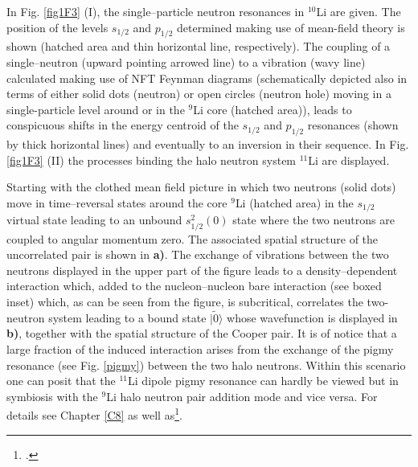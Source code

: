  
 
 
 In Fig. \ref{fig1F3} (I), the single--particle neutron resonances in $^{10}$Li are given. The 
  position of the levels $s_{1/2}$ and $p_{1/2}$ determined making use
 of mean-field theory is shown (hatched area and thin horizontal
 line, respectively). The coupling of a single--neutron (upward
 pointing arrowed line) to a vibration (wavy line) calculated
 making use of NFT Feynman diagrams 
 (schematically depicted also in terms of either solid dots (neutron)
 or open circles (neutron hole) moving in a single-particle
 level around or in the $^9$Li core (hatched area)), leads to conspicuous
 shifts in the energy centroid of the $s_{1/2}$ and $p_{1/2}$ resonances
 (shown by thick horizontal lines) and eventually to
 an inversion in their sequence. In Fig. \ref{fig1F3} (II) the  processes binding the  halo neutron system $^{11}$Li are displayed. 
 
 
 
 
 
  Starting with the clothed mean  field
 picture in which two neutrons (solid dots) move in
 time--reversal states around the core $^{9}$Li (hatched area) in the
 $s_{1/2}$ virtual state leading to an unbound $s^2
 _{1/2}(0)$ state where the
 two neutrons are coupled to  angular momentum zero. The associated spatial structure of the uncorrelated pair is shown in \textbf{a)}. The exchange
 of vibrations between the two neutrons displayed in the upper
 part of the figure leads to a density--dependent interaction
 which, added to the nucleon--nucleon bare interaction (see boxed inset) which, as can be seen from the figure, is subcritical, correlates the
 two-neutron system leading to a bound state $|\tilde 0\rangle$ whose wavefunction is  displayed in \textbf{ b)}, together with the spatial structure of the Cooper pair. It is of notice that a large fraction of the induced interaction arises from the exchange of the pigmy resonance (see Fig. \ref{pigmy}) between the two halo neutrons.  Within this scenario one can posit that the $^{11}$Li dipole pigmy resonance can hardly be viewed but in symbiosis with the $^{9}$Li halo neutron pair addition mode and vice versa. For details see Chapter \ref{C8} as well as\footnote{\cite{Barranco:01}.}.
 
